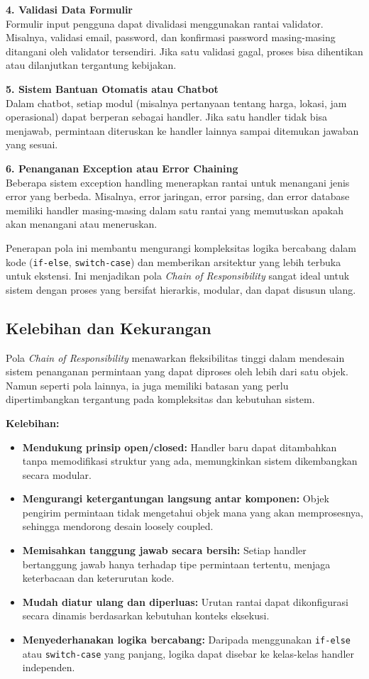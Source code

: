 \textbf{4. Validasi Data Formulir} \\
Formulir input pengguna dapat divalidasi menggunakan rantai validator. Misalnya, validasi email, password, dan konfirmasi password masing-masing ditangani oleh validator tersendiri. Jika satu validasi gagal, proses bisa dihentikan atau dilanjutkan tergantung kebijakan.

\textbf{5. Sistem Bantuan Otomatis atau Chatbot} \\
Dalam chatbot, setiap modul (misalnya pertanyaan tentang harga, lokasi, jam operasional) dapat berperan sebagai handler. Jika satu handler tidak bisa menjawab, permintaan diteruskan ke handler lainnya sampai ditemukan jawaban yang sesuai.

\textbf{6. Penanganan Exception atau Error Chaining} \\
Beberapa sistem exception handling menerapkan rantai untuk menangani jenis error yang berbeda. Misalnya, error jaringan, error parsing, dan error database memiliki handler masing-masing dalam satu rantai yang memutuskan apakah akan menangani atau meneruskan.

Penerapan pola ini membantu mengurangi kompleksitas logika bercabang dalam kode (\texttt{if-else}, \texttt{switch-case}) dan memberikan arsitektur yang lebih terbuka untuk ekstensi. Ini menjadikan pola \textit{Chain of Responsibility} sangat ideal untuk sistem dengan proses yang bersifat hierarkis, modular, dan dapat disusun ulang.

\subsection{Kelebihan dan Kekurangan}

Pola \textit{Chain of Responsibility} menawarkan fleksibilitas tinggi dalam mendesain sistem penanganan permintaan yang dapat diproses oleh lebih dari satu objek. Namun seperti pola lainnya, ia juga memiliki batasan yang perlu dipertimbangkan tergantung pada kompleksitas dan kebutuhan sistem.

\textbf{Kelebihan:}
\begin{itemize}
	\item \textbf{Mendukung prinsip open/closed:} Handler baru dapat ditambahkan tanpa memodifikasi struktur yang ada, memungkinkan sistem dikembangkan secara modular.
	\item \textbf{Mengurangi ketergantungan langsung antar komponen:} Objek pengirim permintaan tidak mengetahui objek mana yang akan memprosesnya, sehingga mendorong desain loosely coupled.
	\item \textbf{Memisahkan tanggung jawab secara bersih:} Setiap handler bertanggung jawab hanya terhadap tipe permintaan tertentu, menjaga keterbacaan dan keterurutan kode.
	\item \textbf{Mudah diatur ulang dan diperluas:} Urutan rantai dapat dikonfigurasi secara dinamis berdasarkan kebutuhan konteks eksekusi.
	\item \textbf{Menyederhanakan logika bercabang:} Daripada menggunakan \texttt{if-else} atau \texttt{switch-case} yang panjang, logika dapat disebar ke kelas-kelas handler independen.
\end{itemize}

